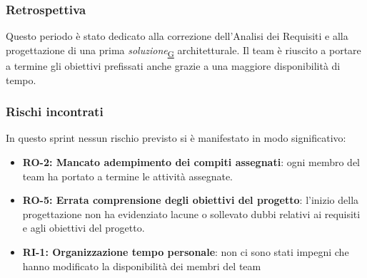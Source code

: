 \documentclass[a4paper,12pt]{article}
\begin{document}
        \subsubsection{Retrospettiva} {
            Questo periodo è stato dedicato alla correzione dell'Analisi dei Requisiti e alla progettazione di una prima \textit{soluzione}\textsubscript{\href{https://atlasteam9.github.io/Atlas/glossario.html\#Soluzione}{G}} architetturale. Il team è riuscito a portare a termine gli obiettivi prefissati anche grazie a una maggiore disponibilità di tempo.
        }

        \subsubsection{Rischi incontrati}{
            In questo sprint nessun rischio previsto si è manifestato in modo significativo:
            \begin{itemize}
                \item \textbf{RO-2: Mancato adempimento dei compiti assegnati}: ogni membro del team ha portato a termine le attività assegnate.
                \item \textbf{RO-5: Errata comprensione degli obiettivi del progetto}: l'inizio della progettazione non ha evidenziato lacune o sollevato dubbi relativi ai requisiti e agli obiettivi del progetto.
                \item \textbf{RI-1: Organizzazione tempo personale}: non ci sono stati impegni che hanno modificato la disponibilità dei membri del team
            \end{itemize}
        }
\end{document}

